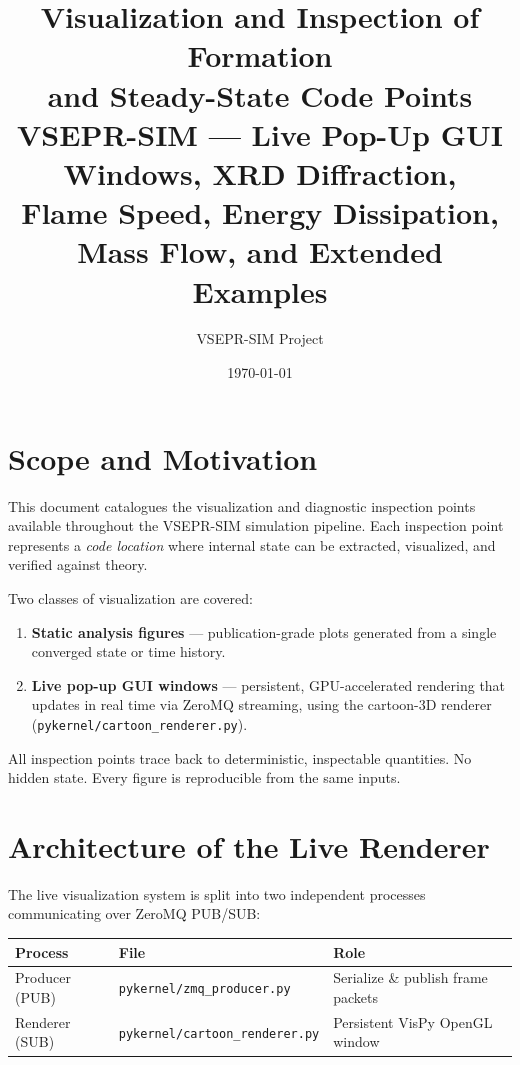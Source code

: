 \documentclass[11pt,a4paper]{article}
\title{%
  \textbf{Visualization and Inspection of Formation\\
  and Steady-State Code Points}\\[6pt]
  \large VSEPR-SIM --- Live Pop-Up GUI Windows, XRD Diffraction,\\
  Flame Speed, Energy Dissipation, Mass Flow, and Extended Examples}
\author{VSEPR-SIM Project}
\date{\today}
\begin{document}
\maketitle
\tableofcontents
\newpage

\section{Scope and Motivation}

This document catalogues the visualization and diagnostic inspection points
available throughout the VSEPR-SIM simulation pipeline.  Each inspection
point represents a \emph{code location} where internal state can be
extracted, visualized, and verified against theory.

Two classes of visualization are covered:
\begin{enumerate}[label=(\alph*)]
  \item \textbf{Static analysis figures} --- publication-grade plots
        generated from a single converged state or time history.
  \item \textbf{Live pop-up GUI windows} --- persistent, GPU-accelerated
        rendering that updates in real time via ZeroMQ streaming, using
        the cartoon-3D renderer (\texttt{pykernel/cartoon\_renderer.py}).
\end{enumerate}

All inspection points trace back to deterministic, inspectable quantities.
No hidden state.  Every figure is reproducible from the same inputs.

\section{Architecture of the Live Renderer}
\label{sec:architecture}

The live visualization system is split into two independent processes
communicating over ZeroMQ PUB/SUB:

\begin{center}
\begin{tabular}{lll}
\toprule
\textbf{Process} & \textbf{File} & \textbf{Role} \\
\midrule
Producer (PUB) & \texttt{pykernel/zmq\_producer.py} & Serialize \& publish frame packets \\
Renderer (SUB) & \texttt{pykernel/cartoon\_renderer.py} & Persistent VisPy OpenGL window \\
\bottomrule
\end{tabular}
\end{center}
\end{document}

